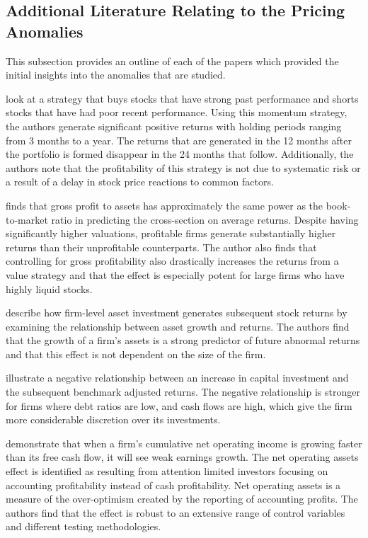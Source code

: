 \documentclass[12pt, a4paper, oneside]{article}
\begin{document}
\subsection{Additional Literature Relating to the Pricing Anomalies}
This subsection provides an outline of each of the papers which provided the initial insights into the anomalies that are studied.

 look at a strategy that buys stocks that have strong past performance and shorts stocks that have had poor recent performance. Using this momentum strategy, the authors generate significant positive returns with holding periods ranging from 3 months to a year. The returns that are generated in the 12 months after the portfolio is formed disappear in the 24 months that follow. Additionally, the authors note that the profitability of this strategy is not due to systematic risk or a result of a delay in stock price reactions to common factors. 

 finds that gross profit to assets has approximately the same power as the book-to-market ratio in predicting the cross-section on average returns. Despite having significantly higher valuations, profitable firms generate substantially higher returns than their unprofitable counterparts. The author also finds that controlling for gross profitability also drastically increases the returns from a value strategy and that the effect is especially potent for large firms who have highly liquid stocks. 

 describe how firm-level asset investment generates subsequent stock returns by examining the relationship between asset growth and returns. The authors find that the growth of a firm's assets is a strong predictor of future abnormal returns and that this effect is not dependent on the size of the firm. 

 illustrate a negative relationship between an increase in capital investment and the subsequent benchmark adjusted returns. The negative relationship is stronger for firms where debt ratios are low, and cash flows are high, which give the firm more considerable discretion over its investments.

 demonstrate that when a firm’s cumulative net operating income is growing faster than its free cash flow, it will see weak earnings growth. The net operating assets effect is identified as resulting from attention limited investors focusing on accounting profitability instead of cash profitability. Net operating assets is a measure of the over-optimism created by the reporting of accounting profits. The authors find that the effect is robust to an extensive range of control variables and different testing methodologies. 
\end{document}
